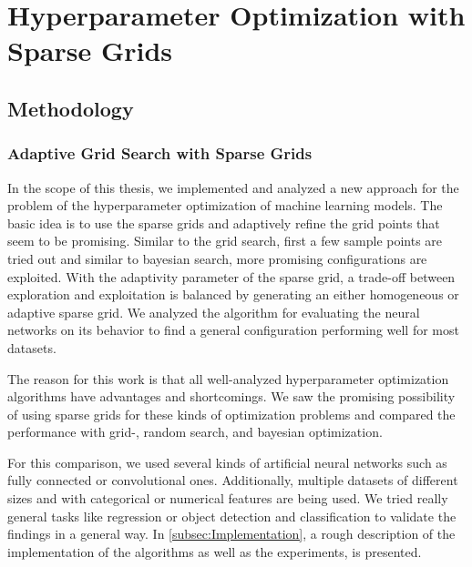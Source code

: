 
\chapter{Hyperparameter Optimization with Sparse Grids}\label{chapter:main_part}

\section{Methodology}

\subsection{Adaptive Grid Search with Sparse Grids}

In the scope of this thesis, we implemented and analyzed a new approach for the problem of the hyperparameter optimization of machine learning models. The basic idea is to use the sparse grids and adaptively refine the grid points that seem to be promising. Similar to the grid search, first a few sample points are tried out and similar to bayesian search, more promising configurations are exploited. With the adaptivity parameter of the sparse grid, a trade-off between exploration and exploitation is balanced by generating an either homogeneous or adaptive sparse grid. We analyzed the algorithm for evaluating the neural networks on its behavior to find a general configuration performing well for most datasets. \newline 

The reason for this work is that all well-analyzed hyperparameter optimization algorithms have advantages and shortcomings. We saw the promising possibility of using sparse grids for these kinds of optimization problems and compared the performance with grid-, random search, and bayesian optimization. \newline 

For this comparison, we used several kinds of artificial neural networks such as fully connected or convolutional ones. Additionally, multiple datasets of different sizes and with categorical or numerical features are being used. We tried really general tasks like regression or object detection and classification to validate the findings in a general way. In \ref{subsec:Implementation}, a rough description of the implementation of the algorithms as well as the experiments, is presented.

